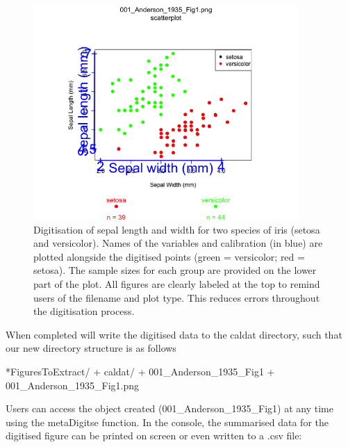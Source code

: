 \documentclass[article]{jss}
\begin{document}
\begin{figure}[!h] 
 \includegraphics[width=0.9\textwidth]{001_Anderson_1935_Fig1_digitised.png} 
 \caption{Digitisation of sepal length and width for two species of iris (setosa and versicolor). Names of the variables and calibration (in blue) are plotted alongside the digitised points (green = versicolor; red = setosa). The sample sizes for each group are provided on the lower part of the plot. All figures are clearly labeled at the top to remind users of the filename and plot type. This reduces errors throughout the digitisation process.}
\label{fig:scatter_extract}
\end{figure}

When completed  will write the digitised data to the caldat directory, such that our new directory structure is as follows

\begin{CodeChunk}
\begin{CodeOutput}
*FiguresToExtract/
    + caldat/
        + 001_Anderson_1935_Fig1
    + 001_Anderson_1935_Fig1.png
\end{CodeOutput}
\end{CodeChunk}

Users can access the  object created (001\_Anderson\_1935\_Fig1) at any time using the metaDigitse function. In the  console, the summarised data for the digitised figure can be printed on screen or even written to a .csv file:
\end{document}
